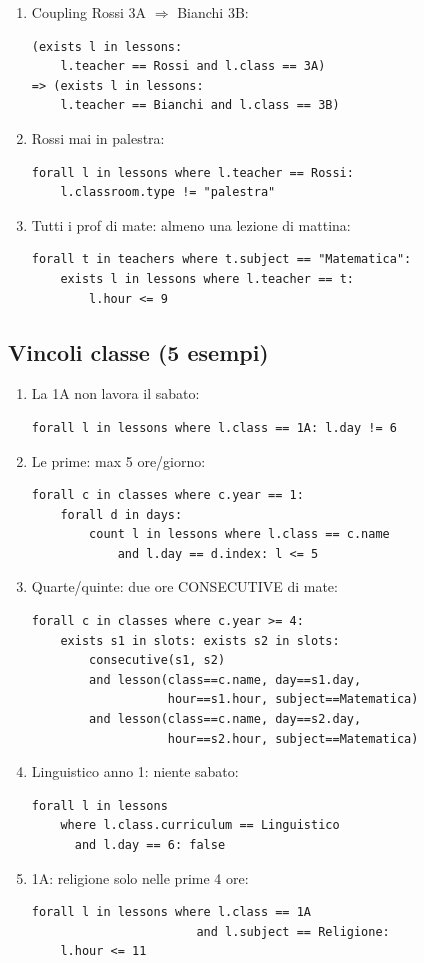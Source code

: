 \begin{enumerate}
\item Coupling Rossi 3A $\Rightarrow$ Bianchi 3B:
\begin{lstlisting}
(exists l in lessons:
    l.teacher == Rossi and l.class == 3A)
=> (exists l in lessons:
    l.teacher == Bianchi and l.class == 3B)
\end{lstlisting}

\item Rossi mai in palestra:
\begin{lstlisting}
forall l in lessons where l.teacher == Rossi:
    l.classroom.type != "palestra"
\end{lstlisting}

\item Tutti i prof di mate: almeno una lezione di mattina:
\begin{lstlisting}
forall t in teachers where t.subject == "Matematica":
    exists l in lessons where l.teacher == t:
        l.hour <= 9
\end{lstlisting}
\end{enumerate}

\subsection{Vincoli classe (5 esempi)}

\begin{enumerate}
\item La 1A non lavora il sabato:
\begin{lstlisting}
forall l in lessons where l.class == 1A: l.day != 6
\end{lstlisting}

\item Le prime: max 5 ore/giorno:
\begin{lstlisting}
forall c in classes where c.year == 1:
    forall d in days:
        count l in lessons where l.class == c.name
            and l.day == d.index: l <= 5
\end{lstlisting}

\item Quarte/quinte: due ore CONSECUTIVE di mate:
\begin{lstlisting}
forall c in classes where c.year >= 4:
    exists s1 in slots: exists s2 in slots:
        consecutive(s1, s2)
        and lesson(class==c.name, day==s1.day,
                   hour==s1.hour, subject==Matematica)
        and lesson(class==c.name, day==s2.day,
                   hour==s2.hour, subject==Matematica)
\end{lstlisting}

\item Linguistico anno 1: niente sabato:
\begin{lstlisting}
forall l in lessons
    where l.class.curriculum == Linguistico
      and l.day == 6: false
\end{lstlisting}

\item 1A: religione solo nelle prime 4 ore:
\begin{lstlisting}
forall l in lessons where l.class == 1A
                       and l.subject == Religione:
    l.hour <= 11
\end{lstlisting}
\end{enumerate}

